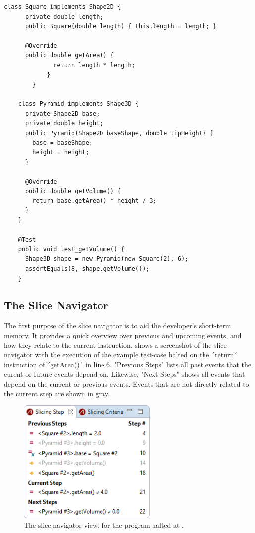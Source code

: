 ﻿\documentclass[
      english,
      ]{llncs}
\begin{document}
\begin{lstlisting}[numberfirstline=true,firstnumber=1,label=lst:example,caption={Example program with a failing test case}]
  	class Square implements Shape2D {
  	  private double length;
  	  public Square(double length) { this.length = length; }
  	  
  	  @Override
  	  public double getArea() { 
			  return length * length; 
			}
		}
  	
  	class Pyramid implements Shape3D {
  	  private Shape2D base;
  	  private double height;
  	  public Pyramid(Shape2D baseShape, double tipHeight) {
  	    base = baseShape;
  	    height = height;
  	  }
  	  
  	  @Override
  	  public double getVolume() { 
  	    return base.getArea() * height / 3; 
  	  }
  	}
  	
    @Test
    public void test_getVolume() {
      Shape3D shape = new Pyramid(new Square(2), 6);
      assertEquals(8, shape.getVolume());
    }
\end{lstlisting}

\subsection{The Slice Navigator}

The first purpose of the slice navigator is to aid the developer's short-term memory.
It provides a quick overview over previous and upcoming events, and how they relate to the current instruction.
 shows a screenshot of the slice navigator with the execution of the example test-case halted on the ´return´ instruction of ´getArea()´ in line 6.
"Previous Steps" lists all past events that the curent or future events depend on.
Likewise, "Next Steps" shows all events that depend on the current or previous events.
Events that are not directly related to the current step are shown in gray.

\begin{figure}
	\centering
		\includegraphics[width=0.60\textwidth]{slice1.png}
	\caption{The slice navigator view, for the program halted at .}
	\label{fig:slice1}
\end{figure}
\end{document}
